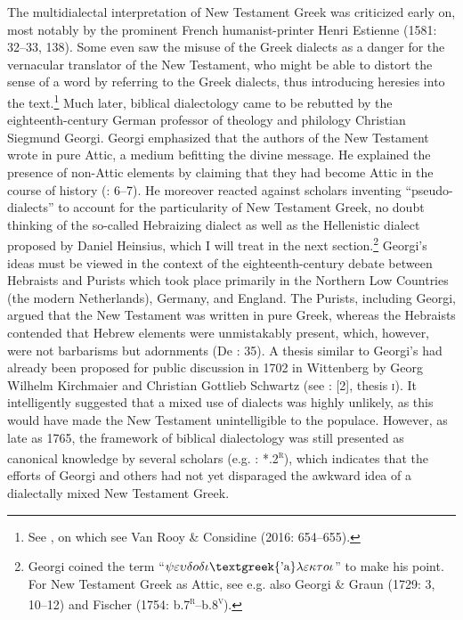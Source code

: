 The multidialectal interpretation of New Testament Greek was criticized early on, most notably by the prominent French humanist-printer Henri Estienne (1581: 32–33, 138). Some even saw the misuse of the Greek dialects as a danger for the vernacular translator of the New Testament, who might be able to distort the sense of a word by referring to the Greek dialects, thus introducing heresies into the text.\footnote{See \citet[429]{Rainolds1583}, on which see Van Rooy \& Considine (2016: 654–655).} Much later, biblical dialectology came to be rebutted by the eighteenth-century German professor of theology and philology Christian Siegmund Georgi. Georgi emphasized that the authors of the New Testament wrote in pure Attic, a medium befitting the divine message. He explained the presence of non-Attic elements by claiming that they had become Attic in the course of history (\citealt{Georgi1733}: 6–7). He moreover reacted against scholars inventing “pseudo-dialects” to account for the particularity of New Testament Greek, no doubt thinking of the so-called Hebraizing dialect as well as the Hellenistic dialect proposed by Daniel Heinsius, which I will treat in the next section.\footnote{Georgi coined the term “$\psi \varepsilon \upsilon \delta o\delta \iota \text{\textgreek{'a}}\lambda \varepsilon \kappa \tau o\iota $” to make his point. For New Testament Greek as Attic, see e.g. also Georgi \& Graun (1729: 3, 10–12) and Fischer (1754: b.7\textsc{\textsuperscript{r}}–b.8\textsc{\textsuperscript{v}}).} Georgi’s ideas must be viewed in the context of the eighteenth-century debate between Hebraists and Purists which took place primarily in the Northern Low Countries (the modern Netherlands), Germany, and England. The Purists, including Georgi, argued that the New Testament was written in pure Greek, whereas the Hebraists contended that Hebrew elements were unmistakably present, which, however, were not barbarisms but adornments (De \citealt{Jonge1980}: 35). A thesis similar to Georgi’s had already been proposed for public discussion in 1702 in Wittenberg by Georg Wilhelm Kirchmaier and Christian Gottlieb Schwartz (see \citealt{KirchmaierSchwartz1702}: [2], thesis \textsc{i}). It intelligently suggested that a mixed use of dialects was highly unlikely, as this would have made the New Testament unintelligible to the populace. However, as late as 1765, the framework of biblical dialectology was still presented as canonical knowledge by several scholars (e.g. \citealt{Gottleber1765}: *.2\textsc{\textsuperscript{r}}), which indicates that the efforts of Georgi and others had not yet disparaged the awkward idea of a dialectally mixed New Testament Greek.

